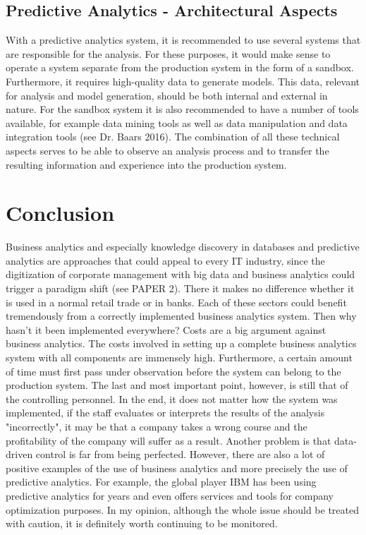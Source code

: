 \documentclass[12pt,twocolumn,twoside]{conference}   %
\begin{document}
\subsection{Predictive Analytics - Architectural Aspects}
With a predictive analytics system, it is recommended to use several systems that are responsible for the analysis. For these purposes, it would make sense to operate a system separate from the production system in the form of a sandbox. Furthermore, it requires high-quality data to generate models. This data, relevant for analysis and model generation, should be both internal and external in nature. For the sandbox system it is also recommended to have a number of tools available, for example data mining tools as well as data manipulation and data integration tools (see Dr. Baars 2016). The combination of all these technical aspects serves to be able to observe an analysis process and to transfer the resulting information and experience into the production system. 

\section{Conclusion}
Business analytics and especially knowledge discovery in databases and predictive analytics are approaches that could appeal to every IT industry, since the digitization of corporate management with big data and business analytics could trigger a paradigm shift (see PAPER 2). There it makes no difference whether it is used in a normal retail trade or in banks. Each of these sectors could benefit tremendously from a correctly implemented business analytics system. Then why hasn't it been implemented everywhere? Costs are a big argument against business analytics. The costs involved in setting up a complete business analytics system with all components are immensely high. Furthermore, a certain amount of time must first pass under observation before the system can belong to the production system. The last and most important point, however, is still that of the controlling personnel. In the end, it does not matter how the system was implemented, if the staff evaluates or interprets the results of the analysis "incorrectly", it may be that a company takes a wrong course and the profitability of the company will suffer as a result. Another problem is that data-driven control is far from being perfected. However, there are also a lot of positive examples of the use of business analytics and more precisely the use of predictive analytics. For example, the global player IBM has been using predictive analytics for years and even offers services and tools for company optimization purposes. In my opinion, although the whole issue should be treated with caution, it is definitely worth continuing to be monitored.  
\newpage
\end{document}
